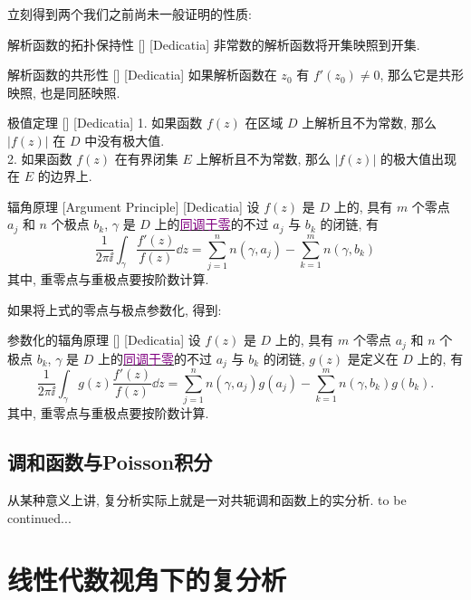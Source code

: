 \documentclass[UTF8]{ctexart}
\newcommand{\hyperrefc}[2]{\hyperref[#1]{\textcolor{purple}{#2}}}
\newcommand{\continued}{{\Large to be continued...}}
\begin{document}
    立刻得到两个我们之前尚未一般证明的性质: 
    \begin{crl}
        [UUID]
        {解析函数的拓扑保持性}
        []
        [Dedicatia]
        非常数的解析函数将开集映照到开集. 
    \end{crl}
    \begin{crl}
        [UUID]
        {解析函数的共形性}
        []
        [Dedicatia]
        如果解析函数在 \(z_0\) 有 \(f'(z_0)\neq 0\), 那么它是共形映照, 也是同胚映照. 
    \end{crl}
    \begin{thm}
        [UUID]
        {极值定理}
        []
        [Dedicatia]
        1. 如果函数 \(f(z)\) 在区域 \(D\) 上解析且不为常数, 那么 \(|f(z)|\) 在 \(D\) 中没有极大值. \\
        2. 如果函数 \(f(z)\) 在有界闭集 \(E\) 上解析且不为常数, 那么 \(|f(z)|\) 的极大值出现在 \(E\) 的边界上. 
    \end{thm}
    \begin{crl}
        [UUID]
        {辐角原理}
        [Argument Principle]
        [Dedicatia]
        设 \(f(z)\) 是 \(D\) 上的\MeromorphicFunction, 具有 \(m\) 个零点 \(a_j\) 和 \(n\) 个极点 \(b_k\),  \(\gamma\) 是 \(D\) 上的\hyperrefc{dfn:NullHomologous}{同调于零}的不过 \(a_j\) 与 \(b_k\) 的闭链, 有
        \[\frac{1}{2\pi\ii}\int_\gamma\frac{f'(z)}{f(z)}\dd{z}=\sum_{j = 1}^{n} n(\gamma,a_j)-\sum_{k = 1}^{m} n(\gamma,b_k)  \]
        其中, 重零点与重极点要按阶数计算. 
    \end{crl}
    如果将上式的零点与极点参数化, 得到: 
    \begin{crl}
        [UUID]
        {参数化的辐角原理}
        []
        [Dedicatia]
        设 \(f(z)\) 是 \(D\) 上的\MeromorphicFunction, 具有 \(m\) 个零点 \(a_j\) 和 \(n\) 个极点 \(b_k\),  \(\gamma\) 是 \(D\) 上的\hyperrefc{dfn:NullHomologous}{同调于零}的不过 \(a_j\) 与 \(b_k\) 的闭链,  \(g(z)\) 是定义在 \(D\) 上的, 有
        \[\frac{1}{2\pi\ii}\int_\gamma g(z)\frac{f'(z)}{f(z)}\dd{z}=\sum_{j = 1}^{n} n(\gamma,a_j)g(a_j)-\sum_{k = 1}^{m} n(\gamma,b_k)g(b_k).  \]
        其中, 重零点与重极点要按阶数计算. 
    \end{crl}

    \subsection{调和函数与Poisson积分}
从某种意义上讲, 复分析实际上就是一对共轭调和函数上的实分析. 
\continued

\section{线性代数视角下的复分析}
    
\end{document}
